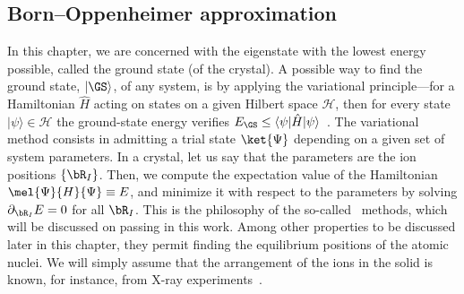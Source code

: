 \subsection{Born--Oppenheimer approximation}
\label{subsec:born_oppenheimer_approximation}

In this chapter, we are concerned with the eigenstate with the lowest energy possible, called the ground state (of the crystal).
A possible way to find the ground state, $| \GS \rangle$, of any system, is by applying the variational principle---for a Hamiltonian $\hat{H}$ acting on states on a given Hilbert space $\mathcal{H}$, then for every state $| \psi \rangle \in \mathcal{H}$ the ground-state energy verifies $E_{\GS} \leq \langle \psi | \hat{H} | \psi \rangle$~\cite{Griffiths_QM_2018}.
The variational method consists in admitting a trial state $\ket{\Psi}$ depending on a given set of system parameters.
In a crystal, let us say that the parameters are the ion positions $\{\bR_I\}$.
Then, we compute the expectation value of the Hamiltonian $\mel{\Psi}{H}{\Psi} \equiv E$, and minimize it with respect to the parameters by solving $\partial_{\bR_I} E = 0$ for all $\bR_I$.
This is the philosophy of the so-called \abinit~methods, which will be discussed on passing in this work.
Among other properties to be discussed later in this chapter, they permit finding the equilibrium positions of the atomic nuclei.
We will simply assume that the arrangement of the ions in the solid is known, for instance, from X-ray experiments~\cite{Kittel_2004,Simon_Oxford_2013}.

